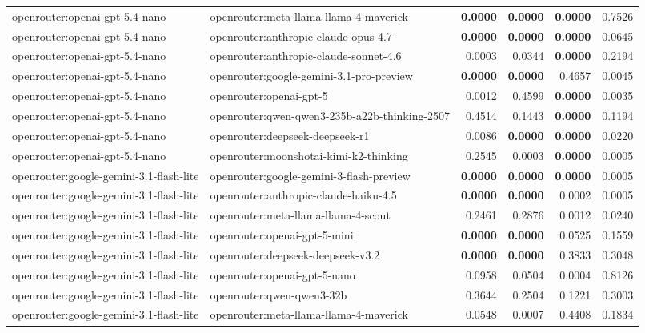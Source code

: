\begin{table}[t]
\begin{tabular}{llrrrr}
openrouter:openai-gpt-5.4-nano & openrouter:meta-llama-llama-4-maverick & \textbf{0.0000} & \textbf{0.0000} & \textbf{0.0000} & 0.7526 \\
openrouter:openai-gpt-5.4-nano & openrouter:anthropic-claude-opus-4.7 & \textbf{0.0000} & \textbf{0.0000} & \textbf{0.0000} & 0.0645 \\
openrouter:openai-gpt-5.4-nano & openrouter:anthropic-claude-sonnet-4.6 & 0.0003 & 0.0344 & \textbf{0.0000} & 0.2194 \\
openrouter:openai-gpt-5.4-nano & openrouter:google-gemini-3.1-pro-preview & \textbf{0.0000} & \textbf{0.0000} & 0.4657 & 0.0045 \\
openrouter:openai-gpt-5.4-nano & openrouter:openai-gpt-5 & 0.0012 & 0.4599 & \textbf{0.0000} & 0.0035 \\
openrouter:openai-gpt-5.4-nano & openrouter:qwen-qwen3-235b-a22b-thinking-2507 & 0.4514 & 0.1443 & \textbf{0.0000} & 0.1194 \\
openrouter:openai-gpt-5.4-nano & openrouter:deepseek-deepseek-r1 & 0.0086 & \textbf{0.0000} & \textbf{0.0000} & 0.0220 \\
openrouter:openai-gpt-5.4-nano & openrouter:moonshotai-kimi-k2-thinking & 0.2545 & 0.0003 & \textbf{0.0000} & 0.0005 \\
openrouter:google-gemini-3.1-flash-lite & openrouter:google-gemini-3-flash-preview & \textbf{0.0000} & \textbf{0.0000} & \textbf{0.0000} & 0.0005 \\
openrouter:google-gemini-3.1-flash-lite & openrouter:anthropic-claude-haiku-4.5 & \textbf{0.0000} & \textbf{0.0000} & 0.0002 & 0.0005 \\
openrouter:google-gemini-3.1-flash-lite & openrouter:meta-llama-llama-4-scout & 0.2461 & 0.2876 & 0.0012 & 0.0240 \\
openrouter:google-gemini-3.1-flash-lite & openrouter:openai-gpt-5-mini & \textbf{0.0000} & \textbf{0.0000} & 0.0525 & 0.1559 \\
openrouter:google-gemini-3.1-flash-lite & openrouter:deepseek-deepseek-v3.2 & \textbf{0.0000} & \textbf{0.0000} & 0.3833 & 0.3048 \\
openrouter:google-gemini-3.1-flash-lite & openrouter:openai-gpt-5-nano & 0.0958 & 0.0504 & 0.0004 & 0.8126 \\
openrouter:google-gemini-3.1-flash-lite & openrouter:qwen-qwen3-32b & 0.3644 & 0.2504 & 0.1221 & 0.3003 \\
openrouter:google-gemini-3.1-flash-lite & openrouter:meta-llama-llama-4-maverick & 0.0548 & 0.0007 & 0.4408 & 0.1834 \\

\end{tabular}
\end{table}
